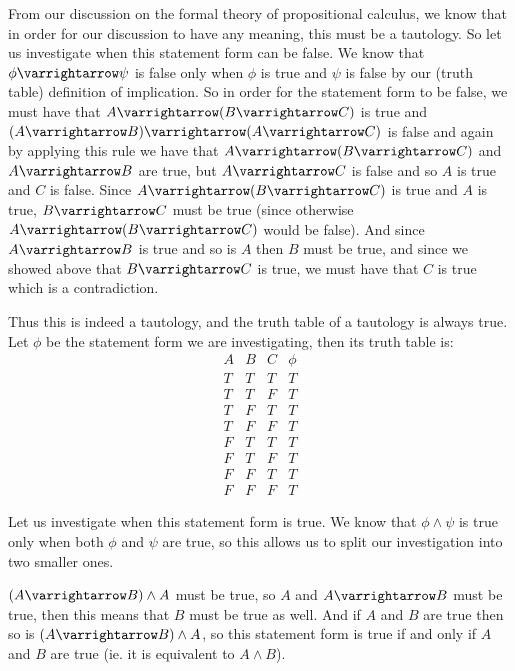 \documentclass[10pt]{article}
\let\to=\varrightarrow
\begin{document}
\begin{blankpp}

    \benum
        \item From our discussion on the formal theory of propositional calculus, we know that in order for our discussion to have any meaning, this must be a tautology.
        So let us investigate when this statement form can be false.
        We know that $\phi\to\psi$ is false only when $\phi$ is true and $\psi$ is false by our (truth table) definition of implication.
        So in order for the statement form to be false, we must have that $A\to(B\to C)$ is true and $(A\to B)\to(A\to C)$ is false and again by applying this rule we have that $A\to(B\to C)$ and $A\to B$
        are true, but $A\to C$ is false and so $A$ is true and $C$ is false.
        Since $A\to(B\to C)$ is true and $A$ is true, $B\to C$ must be true (since otherwise $A\to(B\to C)$ would be false).
        And since $A\to B$ is true and so is $A$ then $B$ must be true, and since we showed above that $B\to C$ is true, we must have that $C$ is true which is a contradiction.

        Thus this is indeed a tautology, and the truth table of a tautology is always true.
        Let $\phi$ be the statement form we are investigating, then its truth table is:
        \[ \begin{array}{c|c|c|c}
            A & B & C & \phi \\
            \hline
            T & T & T & T \\
            T & T & F & T \\
            T & F & T & T \\
            T & F & F & T \\
            F & T & T & T \\
            F & T & F & T \\
            F & F & T & T \\
            F & F & F & T
        \end{array} \]

        \item Let us investigate when this statement form is true.
        We know that $\phi\land\psi$ is true only when both $\phi$ and $\psi$ are true, so this allows us to split our investigation into two smaller ones.
        \blist
            \item $(A\to B)\land A$ must be true, so $A$ and $A\to B$ must be true, then this means that $B$ must be true as well.
            And if $A$ and $B$ are true then so is $(A\to B)\land A$, so this statement form is true if and only if $A$ and $B$ are true (ie. it is equivalent to $A\land B$).


\end{blankpp}
\end{document}
